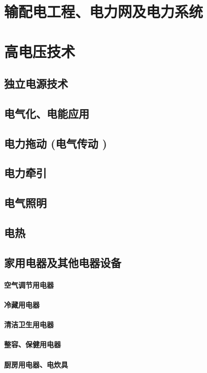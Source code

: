 \documentclass[UTF8]{../../ApplicationUniverse}
\begin{document}
\chapter{输配电工程、电力网及电力系统}


\chapter{高电压技术}
\section{独立电源技术}
\section{电气化、电能应用}
\section{电力拖动 (电气传动 )}
\section{电力牵引}
\section{电气照明}
\section{电热}
\section{家用电器及其他电器设备}
    \subsubsection{空气调节用电器}
    \subsubsection{冷藏用电器}
    \subsubsection{清洁卫生用电器}
    \subsubsection{整容、保健用电器}
    \subsubsection{厨房用电器、电炊具}
\end{document}
